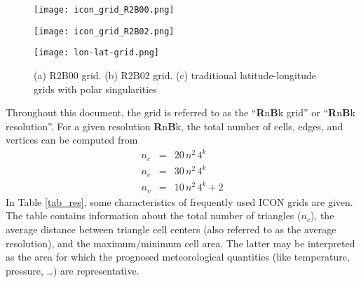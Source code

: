 \begin{figure}[h]
  \begin{minipage}[b]{0.3\textwidth}
    \centering
    \texttt{[image: icon\_grid\_R2B00.png]}
    \subcaption{}\label{fig_R2B00}
  \end{minipage}\hfill
  \begin{minipage}[b]{0.3\textwidth}
    \centering
    \texttt{[image: icon\_grid\_R2B02.png]}
    \subcaption{}\label{fig_R2B02}
  \end{minipage}\hfill
  \begin{minipage}[b]{0.3\textwidth}
    \centering
    \texttt{[image: lon-lat-grid.png]}
    \subcaption{}\label{fig_lonlat}
  \end{minipage}\hfill
  \caption{(a) R2B00 grid. (b) R2B02 grid. (c) traditional latitude-longitude grids with polar singularities}
\end{figure}

Throughout this document, the grid is referred to as the ``\textbf{R}n\textbf{B}k grid'' or ``\textbf{R}n\textbf{B}k resolution''. For a given resolution \textbf{R}n\textbf{B}k, 
the total number of cells, edges, and vertices can be computed from
\begin{eqnarray*}
 n_{c} &=& 20\,n^{2}\,4^{k} \\
 n_{e} &=& 30\,n^{2}\,4^{k} \\
 n_{v} &=& 10\,n^{2}\,4^{k} + 2
\end{eqnarray*}
In Table \ref{tab_res}, some characteristics of frequently used ICON grids are given. The table contains information about the total number of triangles ($n_{c}$), the average 
distance between triangle cell centers (also referred to as the average resolution), and the maximum/minimum cell area. The latter may be interpreted as the area for which 
the prognosed meteorological quantities (like temperature, pressure, \dots) are representative.

